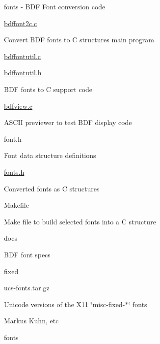 fonts -\/ B\+DF Font conversion code
\begin{DoxyItemize}
\item \hyperlink{bdffont2c_8c}{bdffont2c.\+c}
\begin{DoxyItemize}
\item Convert B\+DF fonts to C structures main program
\end{DoxyItemize}
\item \hyperlink{bdffontutil_8c}{bdffontutil.\+c}
\item \hyperlink{bdffontutil_8h}{bdffontutil.\+h}
\begin{DoxyItemize}
\item B\+DF fonts to C support code
\end{DoxyItemize}
\item \hyperlink{bdfview_8c}{bdfview.\+c}
\begin{DoxyItemize}
\item A\+S\+C\+II previewer to test B\+DF display code
\end{DoxyItemize}
\item font.\+h
\begin{DoxyItemize}
\item Font data structure definitions
\end{DoxyItemize}
\item \hyperlink{fonts_8h}{fonts.\+h}
\begin{DoxyItemize}
\item Converted fonts as C structures
\end{DoxyItemize}
\item Makefile
\begin{DoxyItemize}
\item Make file to build selected fonts into a C structure
\end{DoxyItemize}
\item docs
\begin{DoxyItemize}
\item B\+DF font specs
\end{DoxyItemize}
\item fixed
\begin{DoxyItemize}
\item ucs-\/fonts.\+tar.\+gz
\item Unicode versions of the X11 \char`\"{}misc-\/fixed-\/$\ast$\char`\"{} fonts
\item Markus Kuhn, etc
\end{DoxyItemize}
\item fonts
\begin{DoxyItemize}

\end{DoxyItemize}
\end{DoxyItemize}
